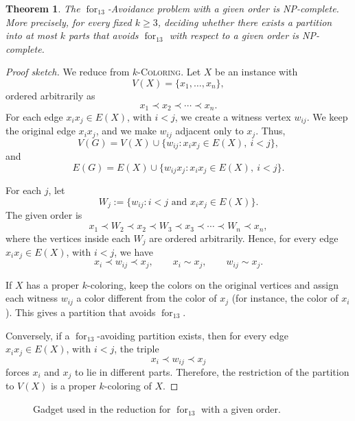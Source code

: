\documentclass[12pt]{article}
\theoremstyle{plain}
\newtheorem{theorem}{Theorem}[section]
\theoremstyle{definition}
\theoremstyle{remark}
\theoremstyle{definition}
\newcommand{\forlabel}{\mathrm{for}}
\DeclareRobustCommand{\forparam}[1]{%
  \ensuremath{\mathop{\forlabel}\nolimits_{#1}}%
}
\newcommand{\forrt}{\forparam{13}}
\begin{document}
\begin{theorem}\label{thm:forrt-given-order-np-complete}
The \(\forrt\)-Avoidance problem with a given order is NP-complete.
More precisely, for every fixed \(k\ge 3\), deciding whether there exists a partition into at most \(k\) parts
that avoids \(\forrt\) with respect to a given order is NP-complete.
\end{theorem}

\begin{proof}[Proof sketch]
We reduce from \(k\)-\textsc{Coloring}. Let \(X\) be an instance with
\[
V(X)=\{x_1,\dots,x_n\},
\]
ordered arbitrarily as
\[
x_1\prec x_2\prec\cdots\prec x_n.
\]
For each edge \(x_i x_j\in E(X)\), with \(i<j\), we create a witness vertex \(w_{ij}\). We keep the original
edge \(x_i x_j\), and we make \(w_{ij}\) adjacent only to \(x_j\). Thus,
\[
V(G)=V(X)\cup \{w_{ij}: x_i x_j\in E(X),\ i<j\},
\]
and
\[
E(G)=E(X)\cup \{w_{ij}x_j : x_i x_j\in E(X),\ i<j\}.
\]

For each \(j\), let
\[
W_j:=\{w_{ij}: i<j \text{ and } x_i x_j\in E(X)\}.
\]
The given order is
\[
x_1\prec W_2\prec x_2\prec W_3\prec x_3\prec\cdots\prec W_n\prec x_n,
\]
where the vertices inside each \(W_j\) are ordered arbitrarily. Hence, for every edge \(x_i x_j\in E(X)\), with \(i<j\),
we have
\[
x_i\prec w_{ij}\prec x_j,
\qquad
x_i\sim x_j,
\qquad
w_{ij}\sim x_j.
\]

If \(X\) has a proper \(k\)-coloring, keep the colors on the original vertices and assign each witness \(w_{ij}\) a color
different from the color of \(x_j\) (for instance, the color of \(x_i\)). This gives a partition that avoids \(\forrt\).

Conversely, if a \(\forrt\)-avoiding partition exists, then for every edge \(x_i x_j\in E(X)\), with \(i<j\), the triple
\[
x_i\prec w_{ij}\prec x_j
\]
forces \(x_i\) and \(x_j\) to lie in different parts. Therefore, the restriction of the partition to \(V(X)\) is a proper
\(k\)-coloring of \(X\).
\end{proof}

\begin{figure}[h]
\centering
{}
\caption{Gadget used in the reduction for \(\forrt\) with a given order.}
\label{fig:forrt-given-order-gadget}
\end{figure}
\end{document}

